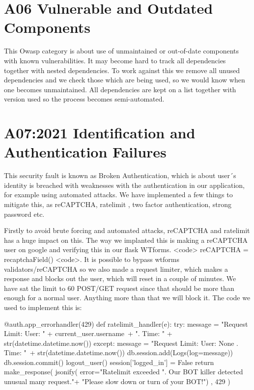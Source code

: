 \section{A06 Vulnerable and Outdated Components}

This Owasp category is about use of unmaintained or out-of-date components with known vulnerabilities. It may become hard to track all dependencies together with nested dependencies.
To work against this we remove all unused dependencies and we check those which are being used, so we would know when one becomes unmaintained. All dependencies are kept on a list together with version used so the process becomes semi-automated.

\section{A07:2021 Identification and Authentication Failures}

This security fault is known as Broken Authentication, which is about user´s identity is breached with weaknesses with the authentication in our application, for example using automated attacks. We have implemented a few things to mitigate this, as reCAPTCHA, ratelimit , two factor authentication, strong password etc.   

Firstly to avoid brute forcing and automated attacks, reCAPTCHA and ratelimit has a huge impact on this. The way we implanted this is making a reCAPTCHA user on google and verifying this in our flask WTforms. <code> reCAPTCHA = recaptchaField() <code>. It is possible to bypass wtforms validators/reCAPTCHA so we also made a request limiter, which makes a response and blocks out the user, which will reset in a couple of minutes. We have sat the limit to 60 POST/GET request since that should be more than enough for a normal user. Anything more than that we will block it. The code we used to implement this is:

\begin{python}
@auth.app_errorhandler(429)
def ratelimit_handler(e):
    try:
        message = "Request Limit: User: " + current_user.username\
                  + ". Time: " + str(datetime.datetime.now())
    except:
        message = "Request Limit: User: None . Time: "\
                  + str(datetime.datetime.now())
    db.session.add(Logs(log=message))
    db.session.commit()
    logout_user()
    session['logged_in'] = False
    return make_response(
        jsonify(
            error="Ratelimit exceeded %
                  ". Our BOT killer detected unusual many request."+
                  "Please slow down or turn of your BOT!")
        , 429
    )
\end{python}

